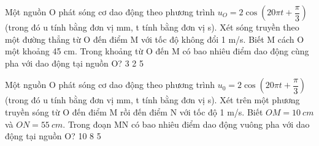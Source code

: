 \begin{vidu}%
Một nguồn O phát sóng cơ dao động theo phương trình $u_O = 2\cos(20\pi t + \dfrac{\pi}{3})$ (trong đó u tính bằng đơn vị mm, t tính bằng đơn vị s). Xét sóng truyền theo một đường thẳng từ O đến điểm M với tốc độ không đổi 1 m/s. Biết M cách O một khoảng 45 cm. Trong khoảng từ O đến M có bao nhiêu điểm dao động cùng pha với dao động tại nguồn O?
\choice
{}
{3}
{2}
{5}
\end{vidu} %
\begin{vidu}%
Một nguồn O phát sóng cơ dao động theo phương trình $u_0=2\cos\left(20\pi t+\dfrac{\pi}{3}\right)$ (trong đó u tính bằng đơn vị mm, t tính bằng đơn vị s). Xét trên một phương truyền sóng từ O đến điểm M rồi đến điểm N với tốc độ 1 m/s. Biết $OM=10\ cm$ và $ON = 55\ cm$. Trong đoạn MN có bao nhiêu điểm dao động vuông pha với dao động tại nguồn O?
\choice
{10}
{8}
{}
{5}
\end{vidu} %

